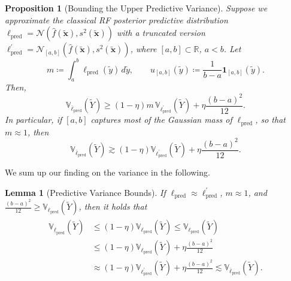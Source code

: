 \documentclass[12pt, english, oneside, a4paper]{article}
\newtheorem{lemma}[theorem]{Lemma}
\newtheorem{proposition}[theorem]{Proposition}
\newcommand{\x}{\boldsymbol{x}}
\begin{document}


\begin{proposition}[Bounding the Upper Predictive Variance]\label{prop-var2}
Suppose we approximate the classical RF posterior predictive distribution
${\ell}_\text{pred}=\mathcal{N}(\hat{f}(\tilde{\x}),s^2(\tilde{\x}))$ with a truncated version
${\ell}_\text{pred}^\prime=\mathcal{N}_{[a,b]}(\hat{f}(\tilde{\x}),s^2(\tilde{\x}))$, where
$[a,b]\subset \mathbb{R}$, $a<b$. Let
\[
m \coloneqq \int_a^b \ell_\text{pred}(\tilde y)\,d\tilde y,
\qquad
u_{[a,b]}(\tilde{y}) \coloneqq \frac{1}{b-a}\mathbf{1}_{[a,b]}(\tilde{y}).
\]
Then,
\[
\mathbb{V}_{\overline{\ell}_\text{pred}}(\tilde{Y})
\ge
(1-\eta)m\, \mathbb{V}_{{\ell}_\text{pred}^\prime}(\tilde{Y}) + \eta \frac{(b-a)^2}{12}.
\]
In particular, if $[a,b]$ captures most of the Gaussian mass of $\ell_\text{pred}$, so that $m\approx 1$, then
\[
\mathbb{V}_{\overline{\ell}_\text{pred}}(\tilde{Y}) \gtrsim
(1-\eta) \mathbb{V}_{{\ell}_\text{pred}^\prime}(\tilde{Y}) + \eta \frac{(b-a)^2}{12}.
\]
\end{proposition}


We sum up our finding on the variance in the following.




\begin{lemma}[Predictive Variance Bounds]\label{var-compl}
    If ${\ell}_\text{pred} \approx {\ell}_\text{pred}^\prime$, $m \approx 1$, and $\frac{(b-a)^2}{12} \geq \mathbb{V}_{{\ell}_\text{pred}}(\tilde{Y})$, then it holds that
\begin{align}\label{var-bds}
\begin{split}
    \mathbb{V}_{\underline{\ell}_\text{pred}}(\tilde{Y}) &\leq (1-\eta) \mathbb{V}_{{\ell}_\text{pred}}(\tilde{Y}) \leq  \mathbb{V}_{{\ell}_\text{pred}}(\tilde{Y})\\
    &\leq 
    (1-\eta) \mathbb{V}_{{\ell}_\text{pred}}(\tilde{Y}) +  \eta \frac{(b-a)^2}{12}\\
    &\approx
    (1-\eta) \mathbb{V}_{{\ell}_\text{pred}^\prime}(\tilde{Y}) +  \eta \frac{(b-a)^2}{12}
     \lesssim \mathbb{V}_{\overline{\ell}_\text{pred}}(\tilde{Y}).
\end{split}
\end{align}
\end{lemma}
\end{document}
